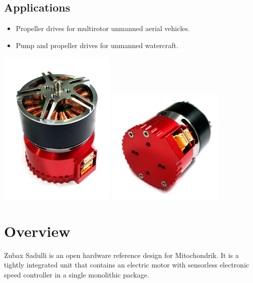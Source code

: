 \documentclass{zubaxdoc}
\begin{document}
\begin{titlepage}
\section*{Applications}

\begin{itemize}
    \item Propeller drives for multirotor unmanned aerial vehicles.
    \item Pump and propeller drives for unmanned watercraft.
\end{itemize}
\centering
\includegraphics[width=0.42\textwidth]{sadulli-top}
\includegraphics[width=0.42\textwidth]{sadulli-bottom}
\end{titlepage}

\tableofcontents
\BeginRightColumn
\listoffigures
\listoftables

\mainmatter

\chapter{Overview}

Zubax Sadulli is an open hardware reference design for Mitochondrik. It is a tightly integrated unit that contains 
an electric motor with sensorless electronic speed controller in a single monolithic package. 
\end{document}
